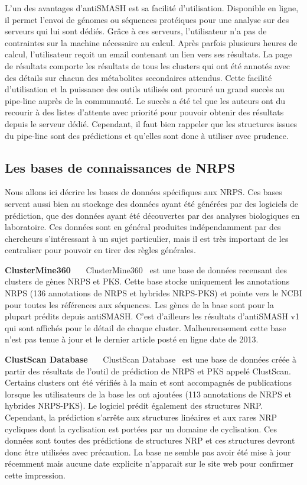 L'un des avantages d'antiSMASH est sa facilité d'utilisation.
Disponible en ligne, il permet l'envoi de génomes ou séquences protéiques pour une analyse sur des serveurs qui lui sont dédiés.
Grâce à ces serveurs, l'utilisateur n'a pas de contraintes sur la machine nécessaire au calcul.
Après parfois plusieurs heures de calcul, l'utilisateur reçoit un email contenant un lien vers ses résultats.
La page de résultats comporte les résultats de tous les clusters qui ont été annotés avec des détails sur chacun des métabolites secondaires attendus.
Cette facilité d'utilisation et la puissance des outils utilisés ont procuré un grand succès au pipe-line auprès de la communauté.
Le succès a été tel que les auteurs ont du recourir à des listes d'attente avec priorité pour pouvoir obtenir des résultats depuis le serveur dédié.
Cependant, il faut bien rappeler que les structures issues du pipe-line sont des prédictions et qu'elles sont donc à utiliser avec prudence.



\subsection{Les bases de connaissances de NRPS}

Nous allons ici décrire les bases de données spécifiques aux NRPS.
Ces bases servent aussi bien au stockage des données ayant été générées par des logiciels de prédiction, que des données ayant été découvertes par des analyses biologiques en laboratoire.
Ces données sont en général produites indépendamment par des chercheurs s'intéressant à un sujet particulier, mais il est très important de les centraliser pour pouvoir en tirer des règles générales.

\textbf{ClusterMine360}~~~
ClusterMine360~\cite{conway_clustermine360:_2013} est une base de données recensant des clusters de gènes NRPS et PKS.
Cette base stocke uniquement les annotations NRPS (136 annotations de NRPS et hybrides NRPS-PKS) et pointe vers le NCBI pour toutes les références aux séquences.
Les gènes de la base sont pour la plupart prédits depuis antiSMASH.
C'est d'ailleurs les résultats d'antiSMASH v1 qui sont affichés pour le détail de chaque cluster.
Malheureusement cette base n'est pas tenue à jour et le dernier article posté en ligne date de 2013.


\textbf{ClustScan Database}~~~
ClustScan Database~\cite{diminic_databases_2013} est une base de données créée à partir des résultats de l'outil de prédiction de NRPS et PKS appelé ClustScan.
Certains clusters ont été vérifiés à la main et sont accompagnés de publications lorsque les utilisateurs de la base les ont ajoutées (113 annotations de NRPS et hybrides NRPS-PKS).
Le logiciel prédit également des structures NRP.
Cependant, la prédiction s'arrête aux structures linéaires et aux rares NRP cycliques dont la cyclisation est portées par un domaine de cyclisation.
Ces données sont toutes des prédictions de structures NRP et ces structures devront donc être utilisées avec précaution.
La base ne semble pas avoir été mise à jour récemment mais aucune date explicite n'apparait sur le site web pour confirmer cette impression.


